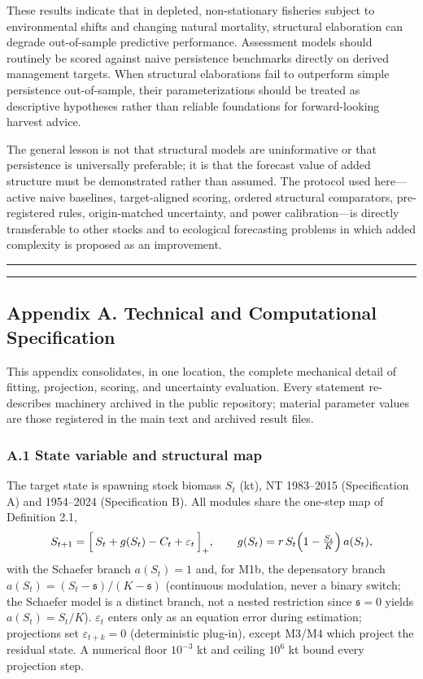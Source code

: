 \documentclass[11pt]{article}
\begin{document}
These results indicate that in depleted, non-stationary fisheries
subject to environmental shifts and changing natural mortality,
structural elaboration can degrade out-of-sample predictive performance.
Assessment models should routinely be scored against naive persistence
benchmarks directly on derived management targets. When structural
elaborations fail to outperform simple persistence out-of-sample, their
parameterizations should be treated as descriptive hypotheses rather
than reliable foundations for forward-looking harvest advice.

The general lesson is not that structural models are uninformative or
that persistence is universally preferable; it is that the forecast
value of added structure must be demonstrated rather than assumed. The
protocol used here---active naive baselines, target-aligned scoring,
ordered structural comparators, pre-registered rules, origin-matched
uncertainty, and power calibration---is directly transferable to other
stocks and to ecological forecasting problems in which added complexity
is proposed as an improvement.

\begin{center}\rule{0.5\linewidth}{0.5pt}\end{center}

\begin{center}\rule{0.5\linewidth}{0.5pt}\end{center}

\subsection{Appendix A. Technical and Computational
Specification}\label{appendix-a.-technical-and-computational-specification}

This appendix consolidates, in one location, the complete mechanical
detail of fitting, projection, scoring, and uncertainty evaluation.
Every statement re-describes machinery archived in the public
repository; material parameter values are those registered in the main
text and archived result files.

\subsubsection{A.1 State variable and structural
map}\label{a.1-state-variable-and-structural-map}

The target state is spawning stock biomass \(S_t\) (kt), NT 1983--2015
(Specification A) and 1954--2024 (Specification B). All modules share
the one-step map of Definition 2.1,
\[S_{t+1} = \Big[\, S_t + g(S_t) - C_t + \varepsilon_t \,\Big]_+, \qquad g(S_t) = r\, S_t \Bigl(1 - \tfrac{S_t}{K}\Bigr)\, a(S_t),\]
with the Schaefer branch \(a(S_t)=1\) and, for M1b, the depensatory
branch \(a(S_t)=(S_t - \mathfrak{s})/(K - \mathfrak{s})\) (continuous
modulation, never a binary switch; the Schaefer model is a distinct
branch, not a nested restriction since \(\mathfrak{s}=0\) yields
\(a(S_t)=S_t/K\)). \(\varepsilon_t\) enters only as an equation error
during estimation; projections set \(\varepsilon_{t+k}=0\)
(deterministic plug-in), except M3/M4 which project the residual state.
A numerical floor \(10^{-3}\) kt and ceiling \(10^{6}\) kt bound every
projection step.
\end{document}
